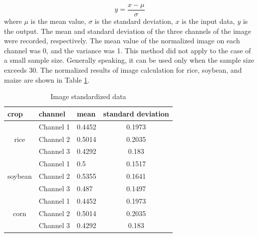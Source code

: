 \documentclass[acmsmall,manuscript, screen, review]{acmart}
\begin{document}
\begin{equation}
  y=\frac{x-\mu}{\sigma}
\end{equation}
where \begin{math}
  \mu
\end{math} is the mean value, \begin{math}
  \sigma
\end{math} is the standard deviation, \begin{math}
  x
\end{math} is the input data, \begin{math}
  y
\end{math} is the output. The mean and standard deviation of the three channels of the image were recorded, respectively. The mean value of the normalized image on each channel was 0, and the variance was 1. This method did not apply to the case of a small sample size. Generally speaking, it can be used only when the sample size exceeds 30. The normalized results of image calculation for rice, soybean, and maize are shown in Table \ref{tab:image_standardized_data}.
\begin{table}[htbp]
  \caption{Image standardized data}
  \label{tab:image_standardized_data}
  \begin{tabular}{lllc}
    \toprule
    crop                                            & channel   & mean   & standard deviation \\
    \midrule
    \multicolumn{1}{c}{\multirow{3}[1]{*}{rice}}    & Channel 1 & 0.4452 & 0.1973             \\
                                                    & Channel 2 & 0.5014 & 0.2035             \\
                                                    & Channel 3 & 0.4292 & 0.183              \\
    \midrule
    \multicolumn{1}{c}{\multirow{3}[0]{*}{soybean}} & Channel 1 & 0.5    & 0.1517             \\
                                                    & Channel 2 & 0.5355 & 0.1641             \\
                                                    & Channel 3 & 0.487  & 0.1497             \\
    \midrule
    \multicolumn{1}{c}{\multirow{3}[1]{*}{corn}}    & Channel 1 & 0.4452 & 0.1973             \\
                                                    & Channel 2 & 0.5014 & 0.2035             \\
                                                    & Channel 3 & 0.4292 & 0.183              \\
    \bottomrule
  \end{tabular}
\end{table}
\end{document}
